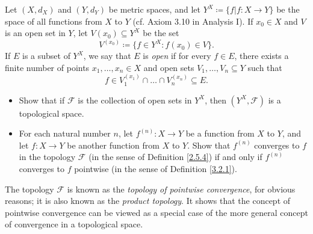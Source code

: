 \begin{exercise}\label{ex 3.4.4}
    Let \((X, d_X)\) and \((Y, d_Y)\) be metric spaces, and let \(Y^X \coloneqq \{f | f : X \to Y \}\) be the space of all functions from \(X\) to \(Y\)
    (cf. Axiom 3.10 in Analysis I).
    If \(x_0 \in X\) and \(V\) is an open set in \(Y\), let \(V(x_0) \subseteq Y^X\) be the set
    \[
        V^{(x_0)} \coloneqq \{f \in Y^X : f(x_0) \in V\}.
    \]
    If \(E\) is a subset of \(Y^X\), we say that \(E\) is \emph{open} if for every \(f \in E\), there exists a finite number of points \(x_1, \dots, x_n \in X\) and open sets \(V_1, \dots, V_n \subseteq Y\) such that
    \[
        f \in V_1^{(x_1)} \cap \dots \cap V_n^{(x_n)} \subseteq E.
    \]
    \begin{itemize}
        \item Show that if \(\mathcal{F}\) is the collection of open sets in \(Y^X\), then \((Y^X , \mathcal{F})\) is a topological space.
        \item For each natural number \(n\), let \(f^{(n)} : X \to Y\) be a function from \(X\) to \(Y\), and let \(f : X \to Y\) be another function from \(X\) to \(Y\).
              Show that \(f^{(n)}\) converges to \(f\) in the topology \(\mathcal{F}\) (in the sense of Definition \ref{2.5.4}) if and only if \(f^{(n)}\) converges to \(f\) pointwise (in the sense of Definition \ref{3.2.1}).
    \end{itemize}
    The topology \(\mathcal{F}\) is known as the \emph{topology of pointwise convergence}, for obvious reasons;
    it is also known as the \emph{product topology}.
    It shows that the concept of pointwise convergence can be viewed as a special case of the more general concept of convergence in a topological space.
\end{exercise}